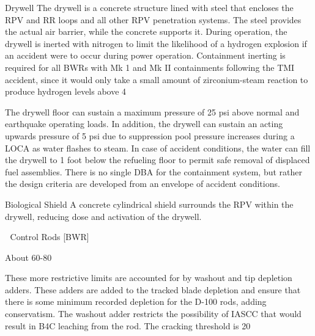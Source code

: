 \documentclass[10pt]{article}
\begin{document}
Drywell
The drywell is a concrete structure lined with steel that encloses the RPV and RR loops and all other RPV penetration systems. The steel provides the actual air barrier, while the concrete supports it. During operation, the drywell is inerted with nitrogen to limit the likelihood of a hydrogen explosion if an accident were to occur during power operation. Containment inerting is required for all BWRs with Mk 1 and Mk II containments following the TMI accident, since it would only take a small amount of zirconium-steam reaction to produce hydrogen levels above 4%

The drywell floor can sustain a maximum pressure of 25 psi above normal and earthquake operating loads. In addition, the drywell can sustain an acting upwards pressure of 5 psi due to suppression pool pressure increases during a LOCA as water flashes to steam. In case of accident conditions, the water can fill the drywell to 1 foot below the refueling floor to permit safe removal of displaced fuel assemblies. There is no single DBA for the containment system, but rather the design criteria are developed from an envelope of accident conditions. 

Biological Shield
A concrete cylindrical shield surrounds the RPV within the drywell, reducing dose and activation of the drywell. 


Control Rods [BWR]


About 60-80%


These more restrictive limits are accounted for by washout and tip depletion adders. These adders are added to the tracked blade depletion and ensure that there is some minimum recorded depletion for the D-100 rods, adding conservatism. The washout adder restricts the possibility of IASCC that would result in B4C leaching from the rod. The cracking threshold is 20%
\end{document}
